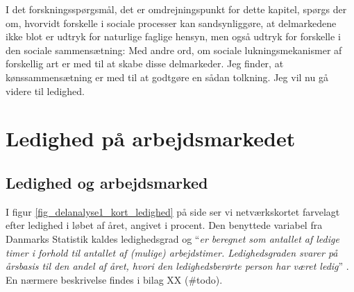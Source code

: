 I det forskningsspørgsmål, det er omdrejningspunkt for dette kapitel, spørgs der om, hvorvidt forskelle i sociale processer kan sandsynliggøre, at delmarkedene ikke blot er udtryk for naturlige faglige hensyn, men også udtryk for forskelle i den sociale sammensætning: Med andre ord, om sociale lukningsmekanismer af forskellig art er med til at skabe disse delmarkeder. Jeg finder, at kønssammensætning er med til at godtgøre en sådan tolkning. Jeg vil nu gå videre til ledighed. 


% 
% 
%
%







\section{Ledighed på arbejdsmarkedet \label{sec_delanalyse2 ledighed generelt}}






%
\subsection{Ledighed og arbejdsmarked}
%


I figur \ref{fig_delanalyse1_kort_ledighed} på side \pageref{fig_delanalyse1_kort_ledighed} ser vi netværkskortet farvelagt efter ledighed i løbet af året, angivet i procent. Den benyttede variabel fra Danmarks Statistik kaldes ledighedsgrad  og  “\emph{er beregnet som antallet af ledige timer i forhold til antallet af (mulige) arbejdstimer. Ledighedsgraden svarer på årsbasis til den andel af året, hvori den ledighedsberørte person har været ledig}” \parencite{DST-ARLEDGR}. En nærmere beskrivelse findes i bilag XX (\#todo). 

